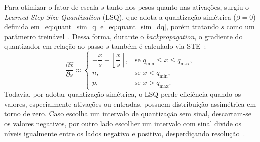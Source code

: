 Para otimizar o fator de escala $s$ tanto nos pesos quanto nas ativações, surgiu o \textit{Learned Step Size Quantization} (LSQ), que adota a quantização simétrica ($\beta = 0$)      
definida em~\eqref{eq:quant_sim_q} e~\eqref{eq:quant_sim_dq}, porém tratando $s$ como um parâmetro treinável~\cite{bhalgat2020}. Dessa forma, durante o \textit{backpropagation}, o    
gradiente do quantizador em relação ao passo $s$ também é calculado via STE~\cite{bhalgat2020,nagel2021}:                                                                              
\begin{equation}                                                                                                                                                                       
\frac{\partial \hat{x}}{\partial s} \approx                                                                                                                                            
\begin{cases}                                                                                                                                                                          
-\dfrac{x}{s} + \left\lfloor \dfrac{x}{s} \right\rceil, & \text{se } q_{\min} \le x \le q_{\max}, \\                                                                                   
n, & \text{se } x < q_{\min}, \\                                                                                                                                                       
p, & \text{se } x > q_{\max}.                                                                                                                                                          
\end{cases}                                                                                                                                                                            
\label{eq:grad_lsq_s}                                                                                                                                                                  
\end{equation}                                                                                                                                                                         
Todavia, por adotar quantização simétrica, o LSQ perde eficiência quando os valores, especialmente ativações ou entradas, possuem distribuição assimétrica em torno de zero. Caso escolha um intervalo de quantização sem sinal, descartam-se os valores negativos, por outro lado escolher um intervalo com sinal divide os níveis igualmente entre os lados negativo e positivo,
desperdiçando resolução~\cite{bhalgat2020}. 

